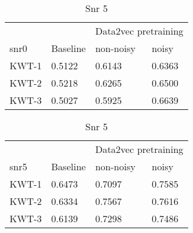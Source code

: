 \begin{table}[ht]
    \begin{subtable}[ht]{0.45\textwidth}
        \centering
        \begin{tabular}{@{}llll@{}}
        \toprule
        & & \multicolumn{2}{c}{Data2vec pretraining} \\ \cline{3-4}
        snr0    & Baseline & non-noisy & noisy \\ \midrule
        KWT-1    & 0.5122  & 0.6143 & 0.6363 \\
        KWT-2    & 0.5218  & 0.6265 & 0.6500 \\
        KWT-3    & 0.5027  & 0.5925 & 0.6639 \\
        \bottomrule
        \end{tabular}
        \caption{Snr 0}
    \end{subtable}
    \hfill
    \begin{subtable}[ht]{0.45\textwidth}
        \centering
        \begin{tabular}{@{}llll@{}}
        \toprule
        & & \multicolumn{2}{c}{Data2vec pretraining} \\ \cline{3-4}
        snr5    & Baseline & non-noisy & noisy \\ \midrule
        KWT-1    & 0.6473  & 0.7097 & 0.7585 \\
        KWT-2    & 0.6334  & 0.7567 & 0.7616 \\
        KWT-3    & 0.6139  & 0.7298 & 0.7486 \\
        \bottomrule
        \end{tabular}
        \caption{Snr 5}
    \end{subtable}


    \bigskip



\end{table}
